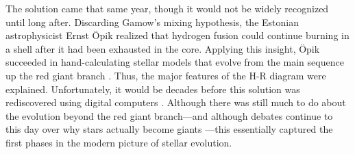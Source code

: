 The solution came that same year, though it would not be widely recognized until long after. 
Discarding Gamow's mixing hypothesis, the Estonian astrophysicist Ernst \"Opik realized that hydrogen fusion could continue burning in a shell after it had been exhausted in the core. 
Applying this insight, \"Opik succeeded in hand-calculating stellar models that evolve from the main sequence up the red giant branch \citep{1938PTarO..30C...1O}. 
Thus, the major features of the H-R diagram were explained. 
Unfortunately, it would be decades before this solution was rediscovered using digital computers \citep[e.g.,][]{ARNY1990211}. 
Although there was still much to do about the evolution beyond the red giant branch---and although debates continue to this day over why stars actually become giants \citep[e.g.,][etc.]{10.1007/978-94-009-8492-9_18,1992ApJ...400..280R,1983A&A...127..411W,1985ApJ...296..554Y,1988ApJ...329..803A,1989MNRAS.236..505W,1991AnPh...16..515W,2000ApJ...538..837S}---this essentially captured the first phases in the modern picture of stellar evolution. 






